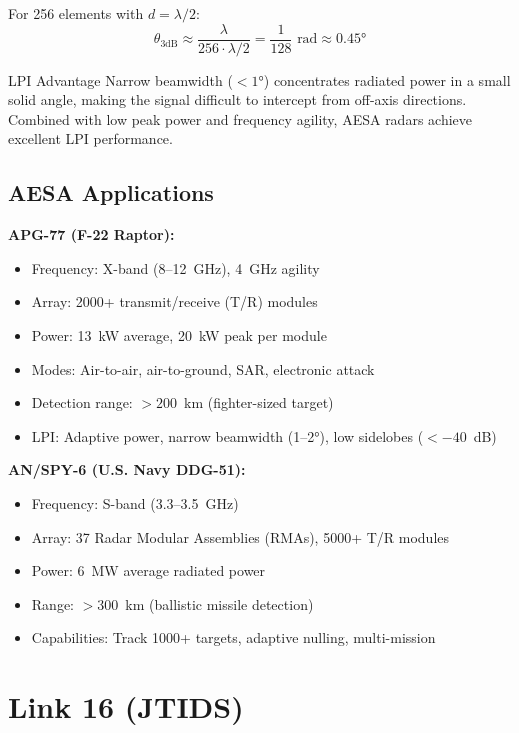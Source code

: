 For 256 elements with $d = \lambda/2$:
\begin{equation}
\theta_{3\text{dB}} \approx \frac{\lambda}{256 \cdot \lambda/2} = \frac{1}{128} \text{ rad} \approx 0.45°
\end{equation}

\begin{calloutbox}{LPI Advantage}
Narrow beamwidth ($<1°$) concentrates radiated power in a small solid angle, making the signal difficult to intercept from off-axis directions. Combined with low peak power and frequency agility, AESA radars achieve excellent LPI performance.
\end{calloutbox}

\subsection{AESA Applications}

\textbf{APG-77 (F-22 Raptor):}
\begin{itemize}
\item Frequency: X-band (8--12~GHz), 4~GHz agility
\item Array: 2000+ transmit/receive (T/R) modules
\item Power: 13~kW average, 20~kW peak per module
\item Modes: Air-to-air, air-to-ground, SAR, electronic attack
\item Detection range: $>200$~km (fighter-sized target)
\item LPI: Adaptive power, narrow beamwidth (1--2°), low sidelobes ($<-40$~dB)
\end{itemize}

\textbf{AN/SPY-6 (U.S. Navy DDG-51):}
\begin{itemize}
\item Frequency: S-band (3.3--3.5~GHz)
\item Array: 37 Radar Modular Assemblies (RMAs), 5000+ T/R modules
\item Power: 6~MW average radiated power
\item Range: $>300$~km (ballistic missile detection)
\item Capabilities: Track 1000+ targets, adaptive nulling, multi-mission
\end{itemize}

\section{Link 16 (JTIDS)}

